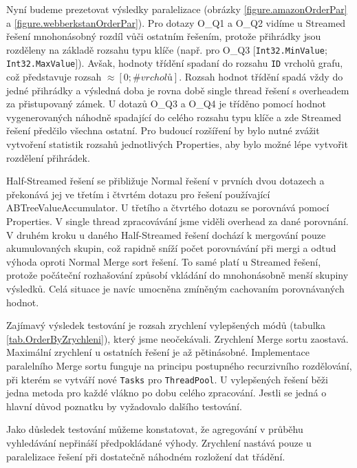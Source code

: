 Nyní budeme prezetovat výsledky paralelizace (obrázky \ref{figure.amazonOrderPar} a \ref{figure.webberkstanOrderPar}).
Pro dotazy O\_Q1 a O\_Q2 vidíme u Streamed řešení mnohonásobný rozdíl vůči ostatním řešením, protože přihrádky jsou rozděleny na základě rozsahu typu klíče (např. pro O\_Q3 $[$\verb+Int32.MinValue+; \verb+Int32.MaxValue+$]$).
Avšak, hodnoty třídění spadaní do rozsahu \verb+ID+ vrcholů grafu, což představuje rozsah $\approx [0; \#vrcholů]$. 
Rozsah hodnot třídění spadá vždy do jedné přihrádky a výsledná doba je rovna době single thread řešení s overheadem za přistupovaný zámek.
U dotazů O\_Q3 a O\_Q4 je tříděno pomocí hodnot vygenerovaných náhodně spadající do celého rozsahu typu klíče a zde Streamed řešení předčilo všechna ostatní. 
Pro budoucí rozšíření by bylo nutné zvážit vytvoření statistik rozsahů jednotlivých Properties, aby bylo možné lépe vytvořit rozdělení přihrádek.

Half-Streamed řešení se přibližuje Normal řešení v prvních dvou dotazech a překonává jej ve třetím i čtvrtém dotazu pro řešení používající ABTreeValueAccumulator.
U třetího a čtvrtého dotazu se porovnává pomocí Properties. V single thread zpracovávání jsme viděli overhead za dané porovnání.
V druhém kroku u daného Half-Streamed řešení dochází k mergování pouze akumulovaných skupin, což rapidně sníží počet porovnávání při mergi a odtud výhoda oproti Normal Merge sort řešení. 
To samé platí u Streamed řešení, protože počáteční rozhašování způsobí vkládání do mnohonásobně menší skupiny výsledků. 
Celá situace je navíc umocněna zmíněným cachovaním porovnávaných hodnot. 

Zajímavý výsledek testování je rozsah zrychlení vylepšených módů (tabulka \ref{tab.OrderByZrychleni}), který jsme neočekávali. 
Zrychlení Merge sortu zaostavá. Maximální zrychlení u ostatních řešení je až pětinásobné. 
Implementace paralelního Merge sortu funguje na principu postupného recurzivního rozdělování, při kterém se vytváří nové \verb+Tasks+ pro \verb+ThreadPool+.
U vylepšených řešení běži jedna metoda pro každé vlákno po dobu celého zpracování. Jestli se jedná o hlavní důvod poznatku by vyžadovalo dalšího testování. 

Jako důsledek testování můžeme konstatovat, že agregování v průběhu vyhledávání nepřináší předpokládané výhody.
Zrychlení nastává pouze u paralelizace řešení při dostatečně náhodném rozložení dat třádění.

